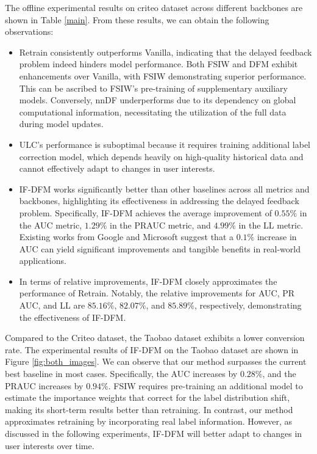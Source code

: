 The offline experimental results on criteo dataset across different backbones are shown in Table \ref{main}. From these results, we can obtain the following observations:
\begin{itemize}[leftmargin=*]
    \item Retrain consistently outperforms Vanilla, indicating that the delayed feedback problem indeed hinders model performance. Both FSIW and DFM exhibit enhancements over Vanilla, with FSIW demonstrating superior performance. This can be ascribed to FSIW's pre-training of supplementary auxiliary models. Conversely, nnDF underperforms due to its dependency on global computational information, necessitating the utilization of the full data during model updates.
    \item ULC's performance is suboptimal because it requires training additional label correction model, which depends heavily on high-quality historical data and cannot effectively adapt to changes in user interests.
    \item IF-DFM works significantly better than other baselines across all metrics and backbones, highlighting its effectiveness in addressing the delayed feedback problem. Specifically, IF-DFM achieves the average improvement of $0.55\%$ in the AUC metric,  $1.29\%$ in the PRAUC metric, and $4.99\%$ in the LL metric. Existing works from Google \cite{cheng2016wide,wang2017deep} and Microsoft \cite{ling2017model} suggest that a $0.1\%$ increase in AUC can yield significant improvements and tangible benefits in real-world applications. 
    \item In terms of relative improvements, IF-DFM closely approximates the performance of Retrain. Notably, the relative improvements for AUC, PR AUC, and LL are $85.16\%$, $82.07\%$, and $85.89\%$, respectively, demonstrating the effectiveness of IF-DFM.
\end{itemize}

Compared to the Criteo dataset, the Taobao dataset exhibits a lower conversion rate. The experimental results of IF-DFM on the Taobao dataset are shown in Figure \ref{fig:both_images}. We can observe that our method surpasses the current best baseline in most cases. Specifically, the AUC increases by $0.28\%$, and the PRAUC increases by $0.94\%$. FSIW requires pre-training an additional model to estimate the importance weights that correct for the label distribution shift, making its short-term results better than retraining. In contrast, our method approximates retraining by incorporating real label information. However, as discussed in the following experiments, IF-DFM will better adapt to changes in user interests over time.


